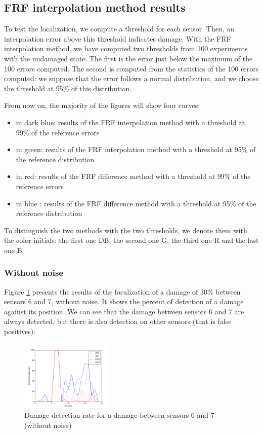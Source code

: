 \documentclass[journal]{IEEEtran}
\begin{document}
\subsection{FRF interpolation method results}

To test the localization, we compute a threshold for each sensor. Then, an interpolation error above this threshold indicates damage. With the FRF interpolation method, we have computed two thresholds from 100 experiments with the undamaged state. The first is the error just below the maximum of the 100 errors computed. The second is computed from the statistics of the 100 errors computed: we suppose that the error follows a normal distribution, and we choose the threshold at 95\% of this distribution.

From now on, the majority of the figures will show four curves:
\begin{itemize}
\item in dark blue: results of the FRF interpolation method with a threshold at 99\% of the reference errors
\item in green: results of the FRF interpolation method with a threshold at 95\% of the reference distribution
\item in red: results of the FRF difference method with a threshold at 99\% of the reference errors
\item in blue : results of the FRF difference method with a threshold at 95\% of the reference distribution
\end{itemize}

To distinguish the two methods with the two thresholds, we denote them with the color initials: the first one DB, the second one G, the third one R and the last one B.

\subsubsection{Without noise}

Figure \ref{damage30} presents the results of the localization of a damage of 30\% between sensors 6 and 7, without noise.
It shows the percent of detection of a damage against its position.
We can see that the damage between sensors 6 and 7 are always detected, but there is also detection on other sensors (that is false positives).

\begin{figure}[h!]
  \centering
  \includegraphics[width=0.4\textwidth]{images/damage30percent.png}
  \caption{Damage detection rate for a damage between sensors 6 and 7 (without noise)}
  \label{damage30}
\end{figure}
\end{document}
